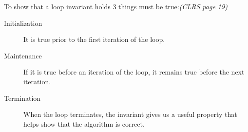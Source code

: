 To show that a loop invariant holds 3 things must be true:\textit{(CLRS page 19)}
\begin{description}
	\item[Initialization] It is true prior to the first iteration of the loop.
	\item[Maintenance] If it is true before an iteration of the loop, it remains true before the next iteration.
	\item[Termination] When the loop terminates, the invariant gives us a useful property that helps show that the algorithm is correct.
\end{description}